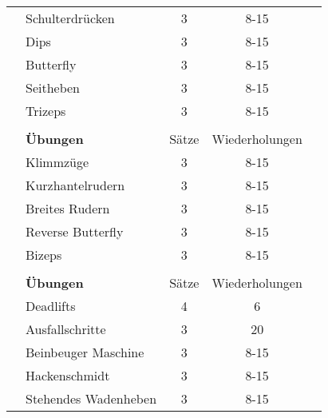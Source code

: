 \documentclass{article}
\begin{document}
\begin{table}[ht]
\begin{tabular}{c|lccc}
\rowcolor[HTML]{FFFFFF} & Schulterdrücken              & 3         & 8-15              &                                  \\
\rowcolor[HTML]{EFEFEF} & Dips                         & 3         & 8-15              &                                  \\
\rowcolor[HTML]{FFFFFF} & Butterfly                    & 3         & 8-15              &                                  \\
\rowcolor[HTML]{EFEFEF} & Seitheben                    & 3         & 8-15              &                                  \\
\rowcolor[HTML]{FFFFFF} & Trizeps                      & 3         & 8-15              &                                  \\ \hline
                        &                              &           &                   &                                  \\
\rowcolor[HTML]{FFCE93} & \textbf{Übungen} & Sätze     & Wiederholungen &  \\ \hline
\rowcolor[HTML]{EFEFEF} & Klimmzüge                    & 3         & 8-15              &                                  \\
\rowcolor[HTML]{FFFFFF} & Kurzhantelrudern             & 3         & 8-15              &                                  \\
\rowcolor[HTML]{EFEFEF} & Breites Rudern               & 3         & 8-15              &                                  \\
\rowcolor[HTML]{FFFFFF} & Reverse Butterfly            & 3         & 8-15              &                                  \\
\rowcolor[HTML]{FFFFFF} & Bizeps                       & 3         & 8-15              &                                  \\ \hline
                        &                              &           &                   &                                  \\
\rowcolor[HTML]{FFCE93} & \textbf{Übungen} & Sätze     & Wiederholungen &  \\ \hline
\rowcolor[HTML]{EFEFEF} & Deadlifts                    & 4            & 6              &                                  \\
\rowcolor[HTML]{FFFFFF} & Ausfallschritte              & 3            & 20             &                                  \\
\rowcolor[HTML]{EFEFEF} & Beinbeuger Maschine          & 3            & 8-15           &                                  \\
\rowcolor[HTML]{FFFFFF} & Hackenschmidt                & 3            & 8-15           &                                  \\
\rowcolor[HTML]{FFFFFF} & Stehendes Wadenheben         & 3            & 8-15           &                                  \\ \hline
\end{tabular}

\end{table}
\end{document}

